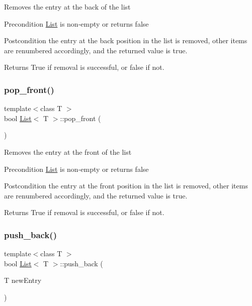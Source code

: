 Removes the entry at the back of the list \begin{DoxyPrecond}{Precondition}
\hyperlink{class_list}{List} is non-\/empty or returns false 
\end{DoxyPrecond}
\begin{DoxyPostcond}{Postcondition}
the entry at the back position in the list is removed, other items are renumbered accordingly, and the returned value is true. 
\end{DoxyPostcond}
\begin{DoxyReturn}{Returns}
True if removal is successful, or false if not. 
\end{DoxyReturn}
\mbox{\label{class_list_a60579fbdaaceccb61aa5d8e33224e045}} 
\subsubsection{\texorpdfstring{pop\+\_\+front()}{pop\_front()}}
{\footnotesize\ttfamily template$<$class T $>$ \\
bool \hyperlink{class_list}{List}$<$ T $>$\+::pop\+\_\+front (\begin{DoxyParamCaption}{ }\end{DoxyParamCaption})}

Removes the entry at the front of the list \begin{DoxyPrecond}{Precondition}
\hyperlink{class_list}{List} is non-\/empty or returns false 
\end{DoxyPrecond}
\begin{DoxyPostcond}{Postcondition}
the entry at the front position in the list is removed, other items are renumbered accordingly, and the returned value is true. 
\end{DoxyPostcond}
\begin{DoxyReturn}{Returns}
True if removal is successful, or false if not. 
\end{DoxyReturn}
\mbox{\label{class_list_adef1cfd54ad3f25eb27acde794e7f279}} 
\subsubsection{\texorpdfstring{push\+\_\+back()}{push\_back()}}
{\footnotesize\ttfamily template$<$class T $>$ \\
bool \hyperlink{class_list}{List}$<$ T $>$\+::push\+\_\+back (\begin{DoxyParamCaption}\item[{T}]{new\+Entry }\end{DoxyParamCaption})}

